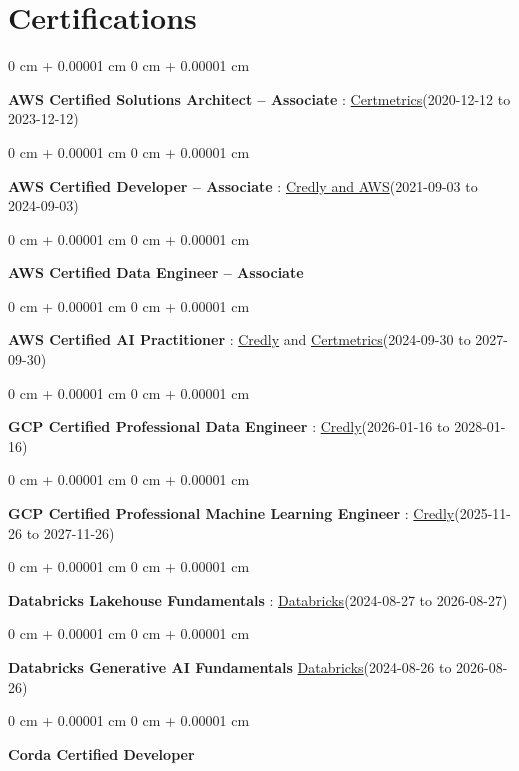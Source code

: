 \documentclass[10pt, letterpaper]{article}
\newenvironment{onecolentry}{
    \begin{adjustwidth}{
        0 cm + 0.00001 cm
    }{
        0 cm + 0.00001 cm
    }
}{
    \end{adjustwidth}
} %
\begin{document}
    \vspace{2 pt }
    \section{Certifications}
        \vspace{2 pt }
        \begin{samepage}
            \begin{onecolentry}
                \textbf{AWS Certified Solutions Architect – Associate} : \href{https://cp.certmetrics.com/amazon/en/public/verify/credential/SNBY48EBJJVE1SWX}{Certmetrics}(2020-12-12 to 2023-12-12)
            \end{onecolentry}
            \begin{onecolentry}
                \textbf{AWS Certified Developer – Associate} : \href{https://www.credly.com/badges/b8106fbd-d3d1-4204-8cdf-e708798fd582/public_url}{Credly and AWS}(2021-09-03  to 2024-09-03)
            \end{onecolentry}
            \begin{onecolentry}
                \textbf{AWS Certified Data Engineer – Associate}
            \end{onecolentry}
            \begin{onecolentry}
                \textbf{AWS Certified AI Practitioner} : \href{https://www.credly.com/badges/451b7ba5-8be1-4a8e-bbec-ade26627a6b6/public_url}{Credly} and \href{https://cp.certmetrics.com/amazon/en/public/verify/credential/495f0d9853874bf9a33c17f8e89ce131}{Certmetrics}(2024-09-30 to 2027-09-30)
            \end{onecolentry}
            \begin{onecolentry}
                \textbf{GCP Certified Professional Data Engineer} : \href{https://www.credly.com/badges/977e96d9-12e7-4f6c-b8a7-df71fb7153b8/public_url}{Credly}(2026-01-16 to 2028-01-16)
            \end{onecolentry}
            \begin{onecolentry}
                \textbf{GCP Certified Professional Machine Learning Engineer} : \href{https://www.credly.com/badges/a6965347-09ea-4d8f-b398-0e151407160d/public_url}{Credly}(2025-11-26 to 2027-11-26)
            \end{onecolentry}
            \begin{onecolentry}
                \textbf{Databricks Lakehouse Fundamentals} : \href{https://scl.io/FXGKS0u}{Databricks}(2024-08-27 to 2026-08-27)
            \end{onecolentry}
            \begin{onecolentry}
                \textbf{Databricks Generative AI Fundamentals} \href{https://sgq.io/3uIFGNi}{Databricks}(2024-08-26 to 2026-08-26)
            \end{onecolentry}
            \begin{onecolentry}
                \textbf{Corda Certified Developer}
            \end{onecolentry}
        \end{samepage}
\end{document}
